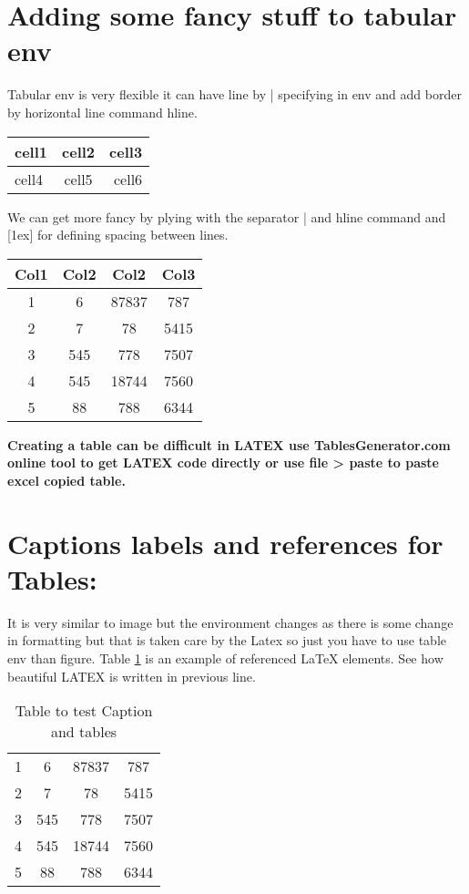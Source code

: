\documentclass[12pt]{report}
\begin{document}
\section{Adding some fancy stuff to tabular env}
Tabular env is very flexible it can have line by | specifying in env and add border by horizontal line command hline.
\begin{center}
    \begin{tabular}{ |l|c|r| }
        \hline
        cell1 & cell2 & cell3 \\
        \hline
        cell4 & cell5 & cell6 \\
        \hline
    \end{tabular}
\end{center}
We can get more fancy by plying with the separator | and hline command and [1ex] for defining spacing between lines.
\begin{center}
 \begin{tabular}{||c c c c||} 
 \hline
 Col1 & Col2 & Col2 & Col3 \\ [0.5ex] 
 \hline\hline
 1 & 6 & 87837 & 787 \\ 
 \hline
 2 & 7 & 78 & 5415 \\
 \hline
 3 & 545 & 778 & 7507 \\
 \hline
 4 & 545 & 18744 & 7560 \\
 \hline
 5 & 88 & 788 & 6344 \\ [1ex] 
 \hline
\end{tabular}
\end{center}
\textbf{Creating a table can be difficult in LATEX use TablesGenerator.com online tool to get LATEX code directly or use file > paste to paste excel copied table.}

\section{Captions labels and references for Tables:}
It is very similar to image but the environment changes as there is some change in formatting but that is taken care by the Latex so just you have to use table env than figure.
Table \ref{table: ak} is an example of referenced \LaTeX{} elements. See how beautiful LATEX is written in previous line.
\begin{table}[h!]
    \centering
    \begin{tabular}{||c c c c||}
        \hline\hline
        1 & 6 & 87837 & 787 \\ 
        2 & 7 & 78 & 5415 \\
        3 & 545 & 778 & 7507 \\
        4 & 545 & 18744 & 7560 \\
        5 & 88 & 788 & 6344 \\ [1ex] 
        \hline
    \end{tabular}
    \caption{Table to test Caption and tables}
    \label{table: ak}
\end{table}
\end{document}
